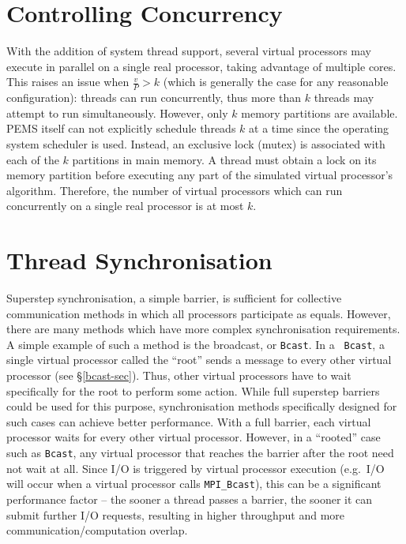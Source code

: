 \documentclass[12pt]{carletoncsthesis}
\begin{document}
\section{Controlling Concurrency}


With the addition of system thread support, several virtual processors may
execute in parallel on a single real processor, taking advantage of multiple
cores.  This raises an issue when $\frac{v}{P} > k$ (which is generally the
case for any reasonable configuration): threads can run concurrently, thus
more than $k$ threads may attempt to run simultaneously.  However, only $k$
memory partitions are available.  PEMS itself can not explicitly schedule
threads $k$ at a time since the operating system scheduler is used.  Instead,
an exclusive lock (mutex) is associated with each of the $k$ partitions
in main memory.  A thread must obtain a lock on its memory partition before
executing any part of the simulated virtual processor's algorithm.  Therefore,
the number of virtual processors which can run concurrently on a single real
processor is at most $k$.

\section{Thread Synchronisation}
\label{synchronisation}


Superstep synchronisation, a simple barrier, is sufficient for collective
communication methods in which all processors participate as equals.  However,
there are many methods which have more complex synchronisation requirements.
A simple example of such a method is the broadcast, or {\tt Bcast}.  In a {\tt
Bcast}, a single virtual processor called the ``root'' sends a message to
every other virtual processor (see \S\ref{bcast-sec}).  Thus, other virtual
processors have to wait specifically for the root to perform some action.
While full superstep barriers could be used for this purpose, synchronisation
methods specifically designed for such cases can achieve better performance.
With a full barrier, each virtual processor waits for every other virtual
processor.  However, in a ``rooted'' case such as {\tt Bcast}, any virtual
processor that reaches the barrier after the root need not wait at all.
Since I/O is triggered by virtual processor execution (e.g.\ I/O will occur
when a virtual processor calls {\tt MPI\_Bcast}), this can be a significant
performance factor -- the sooner a thread passes a barrier, the sooner it
can submit further I/O requests, resulting in higher throughput and more
communication/computation overlap.
\end{document}
